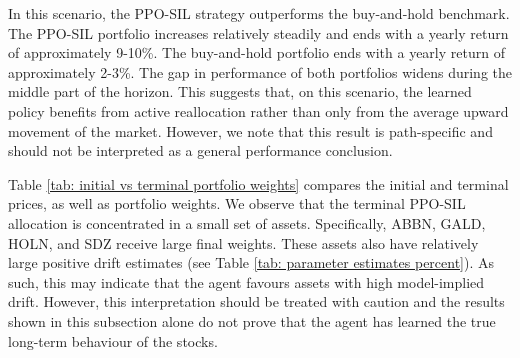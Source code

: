 In this scenario, the PPO-SIL strategy outperforms the buy-and-hold benchmark. The PPO-SIL portfolio increases relatively steadily and ends with a yearly return of approximately 9-10\%. The buy-and-hold portfolio ends with a yearly return of approximately 2-3\%. The gap in performance of both portfolios widens during the middle part of the horizon. This suggests that, on this scenario, the learned policy benefits from active reallocation rather than only from the average upward movement of the market. However, we note that this result is path-specific and should not be interpreted as a general performance conclusion.

Table \ref{tab: initial vs terminal portfolio weights} compares the initial and terminal prices, as well as portfolio weights. We observe that the terminal PPO-SIL allocation is concentrated in a small set of assets. Specifically, ABBN, GALD, HOLN, and SDZ receive large final weights. These assets also have relatively large positive drift estimates (see Table \ref{tab: parameter estimates percent}). As such, this may indicate that the agent favours assets with high model-implied drift. However, this interpretation should be treated with caution and the results shown in this subsection alone do not prove that the agent has learned the true long-term behaviour of the stocks. 
